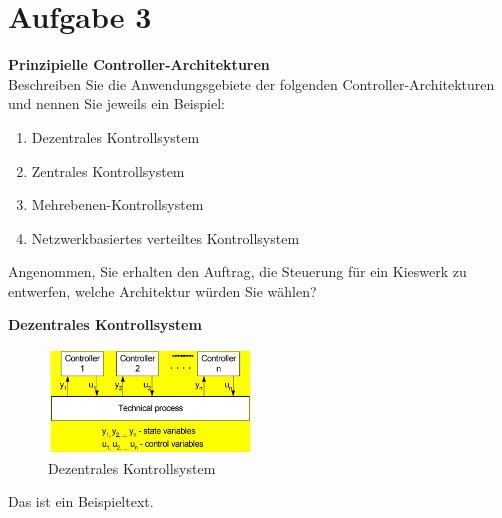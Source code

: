 \documentclass[12pt,a4paper,ngerman]{article}
\begin{document}
\pagebreak


\section{Aufgabe 3}
\begin{framed}
\textbf{Prinzipielle Controller-Architekturen} \\
Beschreiben Sie die Anwendungsgebiete der folgenden Controller-Architekturen und nennen Sie jeweils ein Beispiel:
\begin{enumerate}
\item Dezentrales Kontrollsystem
\item Zentrales Kontrollsystem
\item Mehrebenen-Kontrollsystem
\item Netzwerkbasiertes verteiltes Kontrollsystem
\end{enumerate}
Angenommen, Sie erhalten den Auftrag, die Steuerung für ein Kieswerk zu entwerfen, welche Architektur würden Sie wählen?
\end{framed}

\textbf{Dezentrales Kontrollsystem}
\\

\begin{figure}[h!]
\vspace{-20pt}
  \begin{center}
    \includegraphics[width=0.48\textwidth]{figures/dezentral.pdf}
  \end{center}
  \caption{Dezentrales Kontrollsystem}
\vspace{-10pt}
\end{figure}
Das ist ein Beispieltext. 
\vspace{0.5cm}
\end{document}
